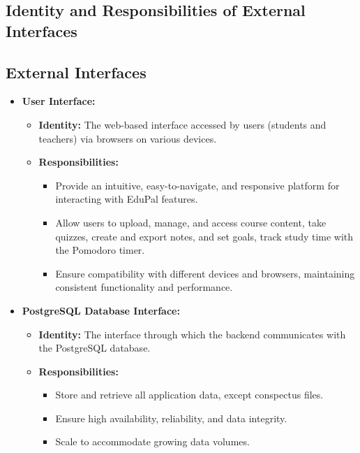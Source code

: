 \subsection{Identity and Responsibilities of External Interfaces}

\subsection*{External Interfaces}
\begin{itemize}
    \item \textbf{User Interface:}
          \begin{itemize}
              \item \textbf{Identity:} The web-based interface accessed by users (students and teachers) via browsers on various devices.
              \item \textbf{Responsibilities:}
                    \begin{itemize}
                        \item Provide an intuitive, easy-to-navigate, and responsive platform for interacting with EduPal features.
                        \item Allow users to upload, manage, and access course content, take quizzes, create and export notes, and set goals, track study time with the Pomodoro timer.
                        \item Ensure compatibility with different devices and browsers, maintaining consistent functionality and performance.
                    \end{itemize}
          \end{itemize}
    \item \textbf{PostgreSQL Database Interface:}
          \begin{itemize}
              \item \textbf{Identity:} The interface through which the backend communicates with the PostgreSQL database.
              \item \textbf{Responsibilities:}
                    \begin{itemize}
                        \item Store and retrieve all application data, except conspectus files.
                        \item Ensure high availability, reliability, and data integrity.
                        \item Scale to accommodate growing data volumes.
                    \end{itemize}

\end{itemize}
\end{itemize}
